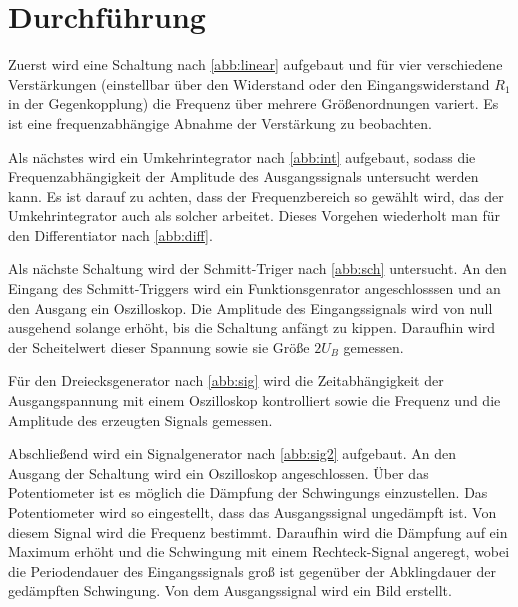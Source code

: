 \section{Durchf{\"u}hrung}
Zuerst wird eine Schaltung nach \autoref{abb:linear} aufgebaut und für vier verschiedene Verstärkungen (einstellbar über den Widerstand oder den Eingangswiderstand $R_1$ in der Gegenkopplung)
die Frequenz über mehrere Größenordnungen variert. Es ist eine frequenzabhängige Abnahme der Verstärkung zu beobachten.

Als nächstes wird ein Umkehrintegrator nach \autoref{abb:int} aufgebaut, sodass die
Frequenzabhängigkeit der Amplitude des Ausgangssignals untersucht werden kann. Es
ist darauf zu achten, dass der Frequenzbereich so gewählt wird, das der Umkehrintegrator
auch als solcher arbeitet. Dieses Vorgehen wiederholt man für den Differentiator nach \autoref{abb:diff}.

Als nächste Schaltung wird der Schmitt-Triger nach \autoref{abb:sch} untersucht.
An den Eingang des Schmitt-Triggers wird ein Funktionsgenrator angeschlosssen und an den Ausgang
ein Oszilloskop. Die Amplitude des Eingangssignals wird von null ausgehend solange erhöht,
bis die Schaltung anfängt zu kippen. Daraufhin wird der Scheitelwert dieser Spannung sowie
sie Größe $2U_B$ gemessen.

Für den Dreiecksgenerator nach \autoref{abb:sig} wird die Zeitabhängigkeit der Ausgangspannung mit einem
Oszilloskop kontrolliert sowie die Frequenz und die Amplitude des erzeugten Signals gemessen.

Abschließend wird ein Signalgenerator nach \autoref{abb:sig2} aufgebaut. An den Ausgang der Schaltung
wird ein Oszilloskop angeschlossen. Über das Potentiometer ist es möglich die Dämpfung der Schwingungs
einzustellen. Das Potentiometer wird so eingestellt, dass das Ausgangssignal ungedämpft ist. Von diesem Signal wird
die Frequenz bestimmt. Daraufhin wird die Dämpfung auf ein Maximum erhöht und
die Schwingung mit einem Rechteck-Signal angeregt, wobei die Periodendauer des Eingangssignals groß ist
gegenüber der Abklingdauer der gedämpften Schwingung. Von dem Ausgangssignal wird ein Bild erstellt.
